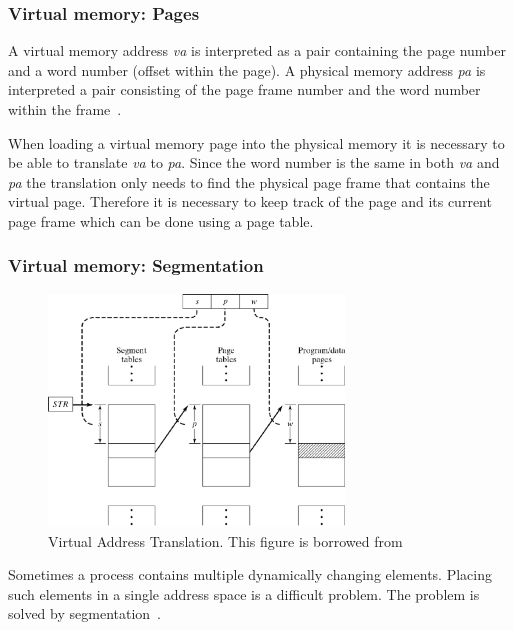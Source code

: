\subsubsection{Virtual memory: Pages}
A virtual memory address \textit{va} is interpreted as a pair  containing the page number and a word number (offset within the page).
A physical memory address \textit{pa} is interpreted a pair  consisting of the page frame number and the word number within the frame~.

When loading a virtual memory page into the physical memory it is  necessary to be able to translate \textit{va} to \textit{pa}.
Since the word number is the same in both \textit{va} and \textit{pa} the translation only needs to find the physical page frame that contains the virtual page.
Therefore it is necessary to keep track of the page and its current page frame which can be done using a page table.

\subsubsection{Virtual memory: Segmentation}

\begin{figure}
\center\includegraphics[width=0.70\textwidth]{virtualAddressTranslation}
\caption{Virtual Address Translation. This figure is borrowed from~\citep[Figure~8-7]{OperatingSystemPrinciples}}
\label{fig:virtualAddressTranslation}
\end{figure}

Sometimes a process contains multiple dynamically changing elements. 
Placing such elements in a single address space is a difficult problem.
The problem is solved by segmentation~.

